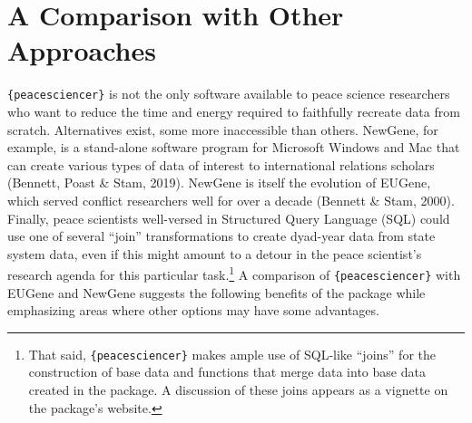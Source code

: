 \documentclass[
  11pt,
]{article}
\begin{document}
\hypertarget{a-comparison-with-other-approaches}{%
\section{A Comparison with Other Approaches}\label{a-comparison-with-other-approaches}}

\texttt{\{peacesciencer\}} is not the only software available to peace science researchers who want to reduce the time and energy required to faithfully recreate data from scratch. Alternatives exist, some more inaccessible than others. NewGene, for example, is a stand-alone software program for Microsoft Windows and Mac that can create various types of data of interest to international relations scholars (Bennett, Poast \& Stam, 2019). NewGene is itself the evolution of EUGene, which served conflict researchers well for over a decade (Bennett \& Stam, 2000). Finally, peace scientists well-versed in Structured Query Language (SQL) could use one of several ``join'' transformations to create dyad-year data from state system data, even if this might amount to a detour in the peace scientist's research agenda for this particular task.\footnote{That said, \texttt{\{peacesciencer\}} makes ample use of SQL-like ``joins'' for the construction of base data and functions that merge data into base data created in the package. A discussion of these joins appears as a vignette on the package's website.} A comparison of \texttt{\{peacesciencer\}} with EUGene and NewGene suggests the following benefits of the package while emphasizing areas where other options may have some advantages.
\end{document}
